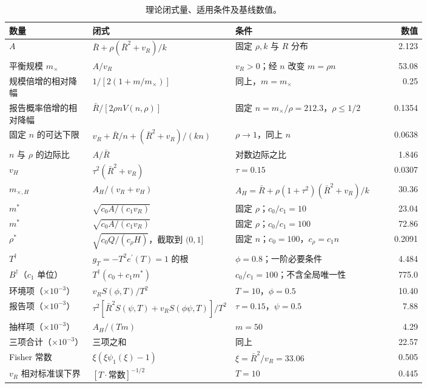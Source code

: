 \begin{table}[htbp]
\centering
\footnotesize
\setlength{\tabcolsep}{3pt}
\caption{理论闭式量、适用条件及基线数值。}
\label{tab:s7}
\begin{tabular}{p{0.2\linewidth}p{0.33\linewidth}p{0.27\linewidth}r}
\toprule
数量 & 闭式 & 条件 & 数值 \\
\midrule
$A$ & $\bar R+\rho(\bar R^2+v_R)/k$ & 固定 $\rho,k$ 与 $R$ 分布 & 2.123 \\
平衡规模 $m_\times$ & $A/v_R$ & $v_R>0$；经 $n$ 改变 $m=\rho n$ & 53.08 \\
规模倍增的相对降幅 & $1/[2(1+m/m_\times)]$ & 同上，$m=m_\times$ & 0.25 \\
报告概率倍增的相对降幅 & $\bar R/[2\rho n V(n,\rho)]$ & 固定 $n=m_\times/\rho=212.3$，$\rho\le1/2$ & 0.1354 \\
固定 $n$ 的可达下限 & $v_R+\bar R/n+(\bar R^2+v_R)/(kn)$ & $\rho\to1$，同上 $n$ & 0.0638 \\
$n$ 与 $\rho$ 的边际比 & $A/\bar R$ & 对数边际之比 & 1.846 \\
$v_H$ & $\tau^2(\bar R^2+v_R)$ & $\tau=0.15$ & 0.0307 \\
$m_{\times,H}$ & $A_H/(v_R+v_H)$ & $A_H=\bar R+\rho(1+\tau^2)(\bar R^2+v_R)/k$ & 30.36 \\
$m^*$ & $\sqrt{c_0A/(c_1v_R)}$ & 固定 $\rho$；$c_0/c_1=10$ & 23.04 \\
$m^*$ & $\sqrt{c_0A/(c_1v_R)}$ & 固定 $\rho$；$c_0/c_1=100$ & 72.86 \\
$\rho^*$ & $\sqrt{c_0Q/(c_\rho H)}$，截取到 $(0,1]$ & 固定 $n$；$c_0=100$，$c_\rho=c_1n$ & 0.2091 \\
$T^\dagger$ & $g_T=-T^2e^\prime(T)=1$ 的根 & $\phi=0.8$；一阶必要条件 & 4.484 \\
$B^\dagger$（$c_1$ 单位） & $T^\dagger(c_0+c_1m^*)$ & $c_0/c_1=100$；不含全局唯一性 & 775.0 \\
环境项（$\times10^{-3}$） & $v_RS(\phi,T)/T^2$ & $T=10$，$\phi=0.5$ & 10.40 \\
报告项（$\times10^{-3}$） & $\tau^2[\bar R^2S(\psi,T)+v_RS(\phi\psi,T)]/T^2$ & $\tau=0.15$，$\psi=0.5$ & 7.88 \\
抽样项（$\times10^{-3}$） & $A_H/(Tm)$ & $m=50$ & 4.29 \\
三项合计（$\times10^{-3}$） & 三项之和 & 同上 & 22.57 \\
Fisher 常数 & $\xi(\xi\psi_1(\xi)-1)$ & $\xi=\bar R^2/v_R=33.06$ & 0.505 \\
$v_R$ 相对标准误下界 & $[T\cdot\text{常数}]^{-1/2}$ & $T=10$ & 0.445 \\

\end{tabular}
\end{table}
